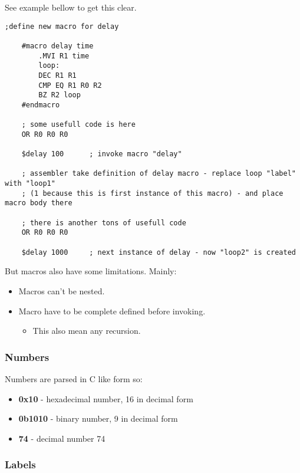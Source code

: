 See example bellow to get this clear.

\begin{lstlisting}[language={[x86masm]Assembler}, frame=single]
    ;define new macro for delay

    #macro delay time
        .MVI R1 time
        loop:
        DEC R1 R1
        CMP EQ R1 R0 R2
        BZ R2 loop
    #endmacro

    ; some usefull code is here
    OR R0 R0 R0

    $delay 100      ; invoke macro "delay"

    ; assembler take definition of delay macro - replace loop "label" with "loop1"
    ; (1 because this is first instance of this macro) - and place macro body there

    ; there is another tons of usefull code
    OR R0 R0 R0

    $delay 1000     ; next instance of delay - now "loop2" is created
\end{lstlisting}

But macros also have some limitations. Mainly:

\begin{itemize}
    \item Macros can't be nested.
    \item Macro have to be complete defined before invoking.
    \begin{itemize}
        \item This also mean any recursion.
    \end{itemize}
\end{itemize}

\subsubsection{Numbers}

Numbers are parsed in C like form so:

\begin{itemize}
    \item \textbf{0x10} - hexadecimal number, 16 in decimal form
    \item \textbf{0b1010} - binary number, 9 in decimal form
    \item \textbf{74} - decimal number 74
\end{itemize}

\subsubsection{Labels}


